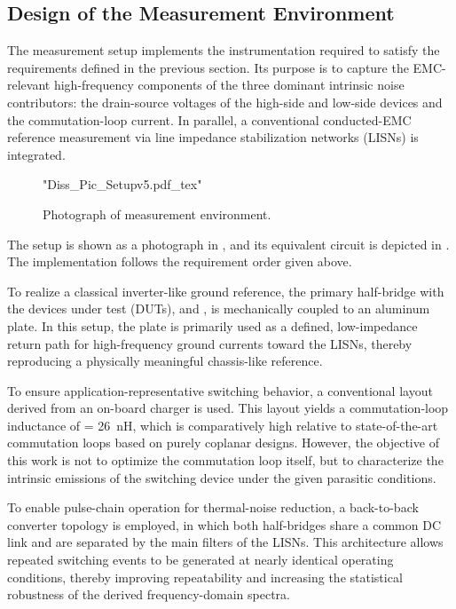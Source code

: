 
\subsection{Design of the Measurement Environment}
The measurement setup implements the instrumentation required to satisfy the requirements defined in the previous section.
Its purpose is to capture the EMC-relevant high-frequency components of the three dominant intrinsic noise contributors: the drain-source voltages of the high-side and low-side devices and the commutation-loop current.
In parallel, a conventional conducted-EMC reference measurement via line impedance stabilization networks (LISNs) is integrated.

\begin{figure}[ht]
	\centering
	{"Diss_Pic_Setupv5.pdf_tex"}
	\caption{Photograph of measurement environment.}\label{fig:pic_b2b_setup}
\end{figure}

The setup is shown as a photograph in , and its equivalent circuit is depicted in .
The implementation follows the requirement order given above.

To realize a classical inverter-like ground reference, the primary half-bridge with the devices under test (DUTs),  and , is mechanically coupled to an aluminum plate.
In this setup, the plate is primarily used as a defined, low-impedance return path for high-frequency ground currents toward the LISNs, thereby reproducing a physically meaningful chassis-like reference.

To ensure application-representative switching behavior, a conventional layout derived from an on-board charger is used.
This layout yields a commutation-loop inductance of  = \SI{26}{nH}, which is comparatively high relative to state-of-the-art commutation loops based on purely coplanar designs.
However, the objective of this work is not to optimize the commutation loop itself, but to characterize the intrinsic emissions of the switching device under the given parasitic conditions.

To enable pulse-chain operation for thermal-noise reduction, a back-to-back converter topology is employed, in which both half-bridges share a common DC link and are separated by the main filters of the LISNs.
This architecture allows repeated switching events to be generated at nearly identical operating conditions, thereby improving repeatability and increasing the statistical robustness of the derived frequency-domain spectra.

